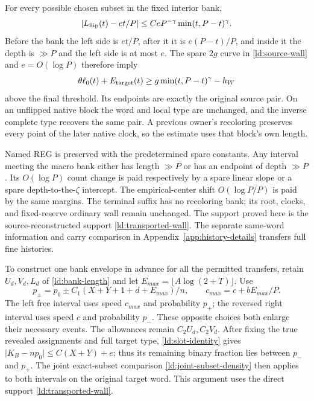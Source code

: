 For every possible chosen subset in the fixed interior bank,
\begin{equation}
 |L_{\rm flip}(t)-et/P|\le
         CeP^{-\gamma}\min(t,P-t)^\gamma.
 \label{ld:slot-error}
\end{equation}
Before the bank the left side is \(et/P\), after it it is
\(e(P-t)/P\), and inside it the depth is \(\gg P\) and
the left side is at most \(e\).  The spare \(2g\) curve in
\eqref{ld:source-wall} and \(e=O(\log P)\) therefore imply
\begin{equation}
 \theta\ell_0(t)+E_{\rm target}(t)
       \ge g\min(t,P-t)^\gamma-h_W
 \label{ld:transported-wall}
\end{equation}
above the final threshold.  Its endpoints are exactly the original
source pair.  On an unflipped native block the word and local type
are unchanged, and the inverse complete type recovers the same
pair.  A previous owner's recoloring preserves every point of the
later native clock, so the estimate uses that block's own length.

Named REG is preserved with the predetermined spare constants.
Any interval meeting the macro bank either has length \(\gg P\)
or has an endpoint of depth \(\gg P\).  Its \(O(\log P)\)
count change is paid respectively by a spare linear slope or a
spare depth-to-the-\(\zeta\) intercept.  The empirical-center
shift \(O(\log P/P)\) is paid by the same margins.  The terminal
suffix has no recoloring bank; its root, clocks, and fixed-reserve
ordinary wall remain unchanged.  The support proved here is the
source-reconstructed support \eqref{ld:transported-wall}.  The
separate same-word information and carry comparison in
Appendix~\ref{app:history-details} transfers full fine histories.

To construct one bank envelope in advance for all the permitted
transfers, retain \(U_d,V_d,L_d\) of \eqref{ld:bank-length} and
let \(E_{max}=\lfloor A\log(2+T)\rfloor\).  Use
\begin{equation}
 p_\pm=p_0\pm C_1(X+Y+1+d+E_{max})/n,\qquad
 c_{max}=c+bE_{max}/P.
 \label{ld:all-e-parameters}
\end{equation}
The left free interval uses speed \(c_{max}\) and probability
\(p_+\); the reversed right interval uses speed \(c\) and
probability \(p_-\).  These opposite choices both enlarge their
necessary events.  The allowances remain \(C_2U_d,C_2V_d\).
After fixing the true revealed assignments and full target type,
\eqref{ld:slot-identity} gives
\(\lvert K_B-np_0\rvert\le C(X+Y)+e\); thus its remaining
binary fraction lies between \(p_-\) and \(p_+\).
The joint exact-subset comparison \eqref{ld:joint-subset-density}
then applies to both intervals on the original target word.  This
argument uses the direct support \eqref{ld:transported-wall}.

